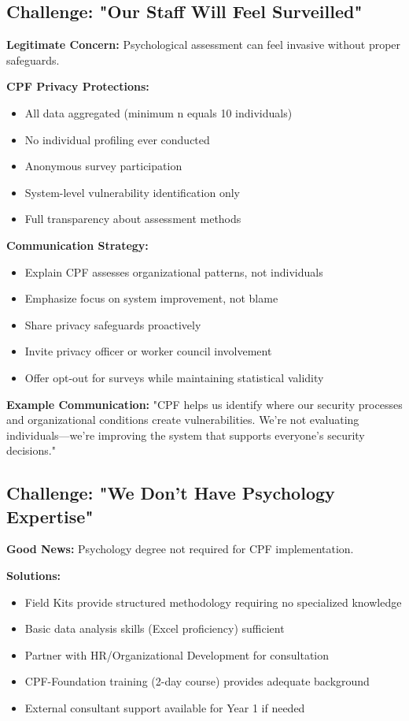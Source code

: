 \documentclass[11pt,a4paper]{article}
\begin{document}
\subsection{Challenge: "Our Staff Will Feel Surveilled"}

\textbf{Legitimate Concern:} Psychological assessment can feel invasive without proper safeguards.

\textbf{CPF Privacy Protections:}
\begin{itemize}
\item All data aggregated (minimum n equals 10 individuals)
\item No individual profiling ever conducted
\item Anonymous survey participation
\item System-level vulnerability identification only
\item Full transparency about assessment methods
\end{itemize}

\textbf{Communication Strategy:}
\begin{itemize}
\item Explain CPF assesses organizational patterns, not individuals
\item Emphasize focus on system improvement, not blame
\item Share privacy safeguards proactively
\item Invite privacy officer or worker council involvement
\item Offer opt-out for surveys while maintaining statistical validity
\end{itemize}

\textbf{Example Communication:}
"CPF helps us identify where our security processes and organizational conditions create vulnerabilities. We're not evaluating individuals---we're improving the system that supports everyone's security decisions."

\subsection{Challenge: "We Don't Have Psychology Expertise"}

\textbf{Good News:} Psychology degree not required for CPF implementation.

\textbf{Solutions:}
\begin{itemize}
\item Field Kits provide structured methodology requiring no specialized knowledge
\item Basic data analysis skills (Excel proficiency) sufficient
\item Partner with HR/Organizational Development for consultation
\item CPF-Foundation training (2-day course) provides adequate background
\item External consultant support available for Year 1 if needed
\end{itemize}
\end{document}
